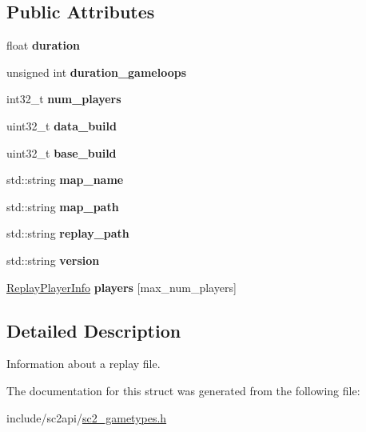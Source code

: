 \subsection*{Public Attributes}
\begin{DoxyCompactItemize}
\item 
\mbox{\label{structsc2_1_1_replay_info_a8158d35ccbf3d64d2efcc2c219e85eaf}} 
float {\bfseries duration}
\item 
\mbox{\label{structsc2_1_1_replay_info_a932258b409210d899c9c4f190f31ee3c}} 
unsigned int {\bfseries duration\+\_\+gameloops}
\item 
\mbox{\label{structsc2_1_1_replay_info_ad5849aad19d5b0077c250be958bdf48a}} 
int32\+\_\+t {\bfseries num\+\_\+players}
\item 
\mbox{\label{structsc2_1_1_replay_info_abc6b972e05dc1551f486cb4d67681724}} 
uint32\+\_\+t {\bfseries data\+\_\+build}
\item 
\mbox{\label{structsc2_1_1_replay_info_a7509c6f50212f8b569ded8a1bb21f264}} 
uint32\+\_\+t {\bfseries base\+\_\+build}
\item 
\mbox{\label{structsc2_1_1_replay_info_a89576422f440d605928047a3af0e90e1}} 
std\+::string {\bfseries map\+\_\+name}
\item 
\mbox{\label{structsc2_1_1_replay_info_a8d8231a57b55a71d2939023bedccafc1}} 
std\+::string {\bfseries map\+\_\+path}
\item 
\mbox{\label{structsc2_1_1_replay_info_a8ffd466b2abbd67a4ceadefd0bf697ed}} 
std\+::string {\bfseries replay\+\_\+path}
\item 
\mbox{\label{structsc2_1_1_replay_info_aacb2d2899b658ece79b143fa5b9376c2}} 
std\+::string {\bfseries version}
\item 
\mbox{\label{structsc2_1_1_replay_info_acbf40a354f66ab304654086c1ded5c85}} 
\hyperlink{structsc2_1_1_replay_player_info}{Replay\+Player\+Info} {\bfseries players} \mbox{[}max\+\_\+num\+\_\+players\mbox{]}
\end{DoxyCompactItemize}


\subsection{Detailed Description}
Information about a replay file. 

The documentation for this struct was generated from the following file\+:\begin{DoxyCompactItemize}
\item 
include/sc2api/\hyperlink{sc2__gametypes_8h}{sc2\+\_\+gametypes.\+h}\end{DoxyCompactItemize}
